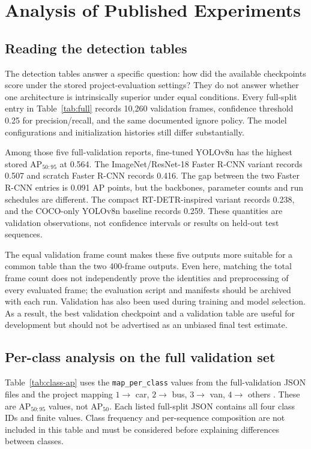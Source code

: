 \section{Analysis of Published Experiments}
\label{sec:results-analysis}
\subsection{Reading the detection tables}
The detection tables answer a specific question: how did the available checkpoints score under the stored project-evaluation settings? They do not answer whether one architecture is intrinsically superior under equal conditions. Every full-split entry in Table~\ref{tab:full} records 10,260 validation frames, confidence threshold 0.25 for precision/recall, and the same documented ignore policy. The model configurations and initialization histories still differ substantially.

Among those five full-validation reports, fine-tuned YOLOv8n has the highest stored AP$_{50:95}$ at 0.564. The ImageNet/ResNet-18 Faster R-CNN variant records 0.507 and scratch Faster R-CNN records 0.416. The gap between the two Faster R-CNN entries is 0.091 AP points, but the backbones, parameter counts and run schedules are different. The compact RT-DETR-inspired variant records 0.238, and the COCO-only YOLOv8n baseline records 0.259. These quantities are validation observations, not confidence intervals or results on held-out test sequences.

The equal validation frame count makes these five outputs more suitable for a common table than the two 400-frame outputs. Even here, matching the total frame count does not independently prove the identities and preprocessing of every evaluated frame; the evaluation script and manifests should be archived with each run. Validation has also been used during training and model selection. As a result, the best validation checkpoint and a validation table are useful for development but should not be advertised as an unbiased final test estimate.

\subsection{Per-class analysis on the full validation set}
Table~\ref{tab:class-ap} uses the \texttt{map\_per\_class} values from the full-validation JSON files and the project mapping $1\rightarrow$ car, $2\rightarrow$ bus, $3\rightarrow$ van, $4\rightarrow$ others \cite{perclass}. These are AP$_{50:95}$ values, not AP$_{50}$. Each listed full-split JSON contains all four class IDs and finite values. Class frequency and per-sequence composition are not included in this table and must be considered before explaining differences between classes.

